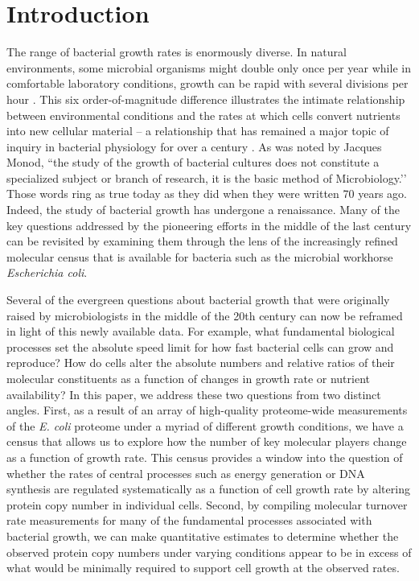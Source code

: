 \section{Introduction}
The range of bacterial growth rates is enormously diverse. In natural
environments, some microbial organisms might double only once per year
\citep{mikucki2009} while in comfortable laboratory conditions, growth can be
rapid with several divisions per hour \citep{schaechter1958}. This six
order-of-magnitude difference illustrates the intimate relationship between
environmental conditions and the rates at which cells convert nutrients into new
cellular material -- a relationship that has remained a major topic of inquiry
in bacterial physiology for over a century \citep{jun2018}. As was noted by
Jacques Monod, ``the study of the growth of bacterial cultures does not
constitute a specialized subject or branch of research, it is the basic method
of Microbiology.’’ \citep{monod1949} Those words ring as true today as they did
when they were written 70 years ago. Indeed, the study of bacterial growth has
undergone a renaissance. Many of the key questions addressed by the
pioneering efforts in the middle of the last century can be revisited by
examining them through the lens of the increasingly refined molecular census
that is available for bacteria such as the microbial workhorse
\textit{Escherichia coli}.

Several of the evergreen questions about bacterial growth that were originally
raised by microbiologists in the middle of the 20th century can now be reframed
in light of this newly available data. For example, what fundamental biological
processes set the absolute speed limit for how fast bacterial cells can grow and
reproduce? How do cells alter the absolute numbers and relative ratios of their
molecular constituents as a function of changes in growth rate or nutrient
availability? In this paper, we address these two questions from two distinct
angles. First, as a result of an array of high-quality proteome-wide
measurements of the \textit{E. coli} proteome under a myriad of different growth
conditions, we have a census that allows us to explore how the number of key
molecular players change as a function of growth rate. This census provides a
window into the question of whether the rates of central processes such as
energy generation or DNA synthesis are regulated systematically as a function of
cell growth rate by altering protein copy number in individual cells. Second, by
compiling molecular turnover rate measurements for many of the fundamental
processes associated with bacterial growth, we can make quantitative estimates
to determine whether the observed protein copy numbers under varying conditions
appear to be in excess of what would be minimally required to support cell
growth at the observed rates.


